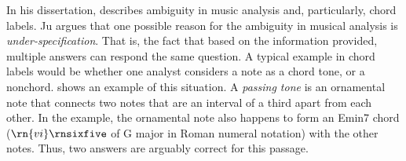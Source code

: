 

In his dissertation, \textcite{ju2021addressing} describes
ambiguity in music analysis and, particularly, chord labels.
Ju argues that one possible reason for the ambiguity in
musical analysis is \emph{under-specification}. That is, the
fact that based on the information provided, multiple
answers can respond the same question. A typical example in
chord labels would be whether one analyst considers a note
as a chord tone, or a \gls{nonchord}. 
shows an example of this situation. A \emph{passing tone} is
an ornamental note that connects two notes that are an
interval of a third apart from each other. In the example,
the ornamental note also happens to form an Emin7 chord
($\rn{vi}\rnsixfive$ of G major in Roman numeral notation)
with the other notes. Thus, two answers are arguably correct
for this passage.

